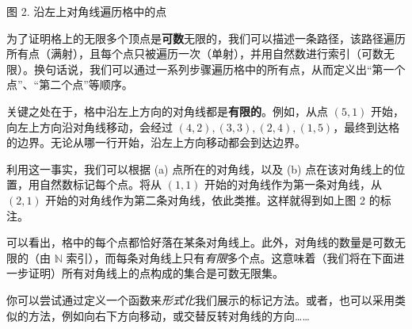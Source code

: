\begin{example}
\begin{multicols}{2}
\begin{center}

        \small 图 2. 沿左上对角线遍历格中的点
    \end{center}
    \end{multicols}

    为了证明格上的无限多个顶点是\textbf{可数}无限的，我们可以描述一条路径，该路径遍历所有点（满射），且每个点只被遍历一次（单射），并用自然数进行索引（可数无限）。换句话说，我们可以通过一系列步骤遍历格中的所有点，从而定义出``第一个点''、``第二个点''等顺序。

    关键之处在于，格中沿左上方向的对角线都是\textbf{有限的}。例如，从点 $(5, 1)$ 开始，向左上方向沿对角线移动，会经过 $(4, 2), (3, 3), (2, 4), (1, 5)$，最终到达格的边界。无论从哪一行开始，沿左上方向移动都会到达边界。

    利用这一事实，我们可以根据 (a) 点所在的对角线，以及 (b) 点在该对角线上的位置，用自然数标记每个点。将从 $(1, 1)$ 开始的对角线作为第一条对角线，从 $(2, 1)$ 开始的对角线作为第二条对角线，依此类推。这样就得到如上图 2 的标注。

    可以看出，格中的每个点都恰好落在某条对角线上。此外，对角线的数量是可数无限的（由 $\mathbb{N}$ 索引），而每条对角线上只有\emph{有限}多个点。这意味着（我们将在下面进一步证明）所有对角线上的点构成的集合是可数无限集。

    你可以尝试通过定义一个函数来\emph{形式化}我们展示的标记方法。或者，也可以采用类似的方法，例如向右下方向移动，或交替反转对角线的方向……
\end{example}

